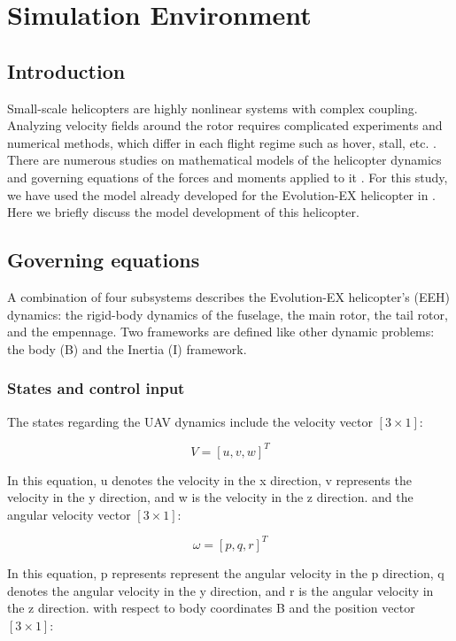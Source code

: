 \chapter{Simulation Environment}
\section{Introduction}
Small-scale helicopters are highly nonlinear systems with complex coupling. Analyzing velocity fields around the rotor requires complicated experiments and numerical methods, which differ in each flight regime such as hover, stall, etc. \cite{doerffer2008numerical,crittenden2004combustion,patterson1990computational}. There are numerous studies on mathematical models of the helicopter dynamics and governing equations of the forces and moments applied to it \cite{padfield2008helicopter,marques2017advanced, seddon2011basic}. For this study, we have used the model already developed for the Evolution-EX helicopter in \cite{pourrezaei2014control}. Here we briefly discuss the model development of this helicopter.
\section{Governing equations}
A combination of four subsystems describes the Evolution-EX helicopter's (EEH) dynamics: the rigid-body dynamics of the fuselage, the main rotor, the tail rotor, and the empennage. Two frameworks are defined like other dynamic problems: the body (B) and the Inertia (I)  framework. 
\subsection{States and control input}
The states regarding the UAV dynamics include the velocity vector $[3\times1]$:

\begin{equation}
	V=[u,v,w]^T	
\end{equation}

In this equation, u denotes the velocity in the x direction, v represents the velocity in the y direction, and w is the velocity in the z direction.
and the angular velocity vector $[3\times1]$:

\begin{equation}
	\omega=[p,q,r]^T
\end{equation}

In this equation, p represents represent the angular velocity in the p direction, q denotes the angular velocity in the y direction, and r is the angular velocity in the z direction.
with respect to body coordinates {B} and the position vector $[3\times1]$:

